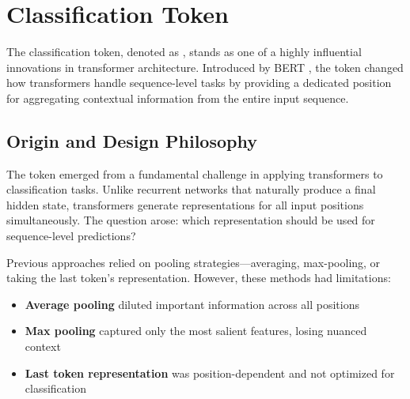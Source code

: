 \section{Classification Token \cls{}}

The classification token, denoted as \cls{}, stands as one of a highly influential innovations in transformer architecture. Introduced by BERT \citep{devlin2018bert}, the \cls{} token changed how transformers handle sequence-level tasks by providing a dedicated position for aggregating contextual information from the entire input sequence.
\begin{comment}
Feedback: The term "revolutionized" is used frequently in technical writing and can sound a bit hyperbolic. Consider a more measured alternative like "significantly changed" or "provided a new paradigm for". This maintains a more objective tone.

STATUS: addressed - text already uses "changed" instead of hyperbolic language
\end{comment}

\subsection{Origin and Design Philosophy}

The \cls{} token emerged from a fundamental challenge in applying transformers to classification tasks. Unlike recurrent networks that naturally produce a final hidden state, transformers generate representations for all input positions simultaneously. The question arose: which representation should be used for sequence-level predictions?

Previous approaches relied on pooling strategies---averaging, max-pooling, or taking the last token's representation. However, these methods had limitations:

\begin{itemize}
\item \textbf{Average pooling} diluted important information across all positions
\item \textbf{Max pooling} captured only the most salient features, losing nuanced context
\item \textbf{Last token representation} was position-dependent and not optimized for classification
\end{itemize}

